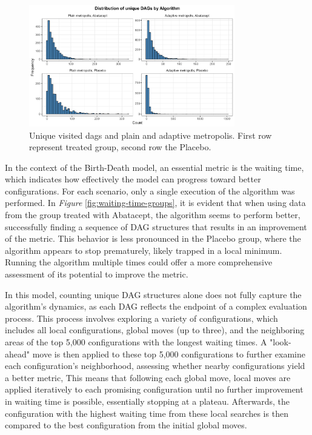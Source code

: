 \documentclass{report}
\begin{document}
	\begin{figure}[ht] 
		\centering
		\includegraphics[width=0.8\textwidth]{Figures/Application/analysis/hist_unique_dags_metropolis.png}
		\caption{Unique visited dags and plain and adaptive metropolis. First row represent treated group, second row the Placebo.}
		\label{fig:unique-dags-metropolis}
	\end{figure}
	
	In the context of the Birth-Death model, an essential metric is the waiting time, which indicates how effectively the model can progress toward better configurations. For each scenario, only a single execution of the algorithm was performed. In \textit{Figure} \ref{fig:waiting-time-groups}, it is evident that when using data from the group treated with Abatacept, the algorithm seems to perform better, successfully finding a sequence of DAG structures that results in an improvement of the metric. This behavior is less pronounced in the Placebo group, where the algorithm appears to stop prematurely, likely trapped in a local minimum. Running the algorithm multiple times could offer a more comprehensive assessment of its potential to improve the metric. 
		
	In this model, counting unique DAG structures alone does not fully capture the algorithm's dynamics, as each DAG reflects the endpoint of a complex evaluation process. This process involves exploring a variety of configurations, which includes all local configurations, global moves (up to three), and the neighboring areas of the top 5,000 configurations with the longest waiting times.
	A "look-ahead" move is then applied to these top 5,000 configurations to further examine each configuration's neighborhood, assessing whether nearby configurations yield a better metric, This means that following each global move, local moves are applied iteratively to each promising configuration until no further improvement in waiting time is possible, essentially stopping at a plateau. Afterwards, the configuration with the highest waiting time from these local searches is then compared to the best configuration from the initial global moves.
	
\end{document}
